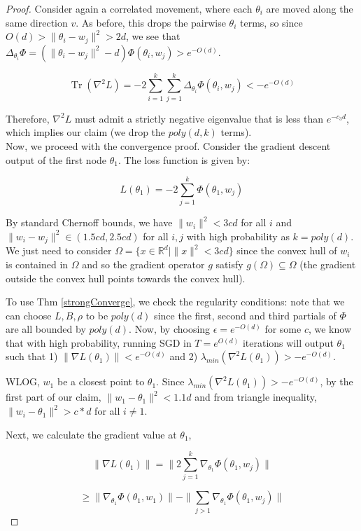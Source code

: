 \documentclass[11pt]{article}
\newcommand{\R}{{\mathbb{R}}}
\DeclareMathOperator{\Tr}{Tr}
\begin{document}
\begin{proof}
Consider again a correlated movement, where each $\theta_i$ are moved along the same direction $v$. As before, this drops the pairwise $\theta_i$ terms, so since $O(d) > \|\theta_i -w_j\|^2 > 2d$, we see that $\Delta_{\theta_i} \Phi = (\|\theta_i -w_j\|^2 - d)\Phi(\theta_i,w_j) > e^{-O(d)}$. 

\[\Tr(\nabla^2 L) = -2\sum_{i=1}^k \sum_{j=1}^k \Delta_{\theta_i}\Phi(\theta_i, w_j) < -e^{-O(d)}\]

Therefore, $\nabla^2 L$ must admit a strictly negative eigenvalue that is less than $e^{-c_3 d}$, which implies our claim (we drop the $poly(d,k)$ terms).\\

Now, we proceed with the convergence proof. Consider the gradient descent output of the first node $\theta_1$. The loss function is given by:

\[L(\theta_1) =  - 2\sum_{j=1}^k \Phi(\theta_1,w_j)\]

By standard Chernoff bounds, we have $\|w_i\|^2 < 3cd$ for all $i$ and $\|w_i -w_j\|^2 \in (1.5cd, 2.5cd)$ for all $i, j$ with high probability as $k = poly(d)$. We just need to consider $\Omega = \{ x \in \R^d | \|x \|^2 < 3cd\}$ since the convex hull of $w_i$ is contained in $\Omega$ and so the gradient operator $g$ satisfy $g(\Omega) \subseteq \Omega$ (the gradient outside the convex hull points towards the convex hull).  

To use Thm \ref{strongConverge}, we check the regularity conditions: note that we can choose $L, B, \rho$ to be $poly(d)$ since the first, second and third partials of $\Phi$ are all bounded by $poly(d)$. Now, by choosing $\epsilon = e^{-O(d)}$ for some $c$, we know that with high probability, running SGD in $T = e^{O(d)}$ iterations will output $\theta_1$ such that 1) $\|\nabla L (\theta_1)\| < e^{-O(d)}$ and 2) $\lambda_{min}(\nabla^2L(\theta_1)) > -e^{-O(d)}$.

WLOG, $w_1$ be a closest point to $\theta_1$. Since  $\lambda_{min}(\nabla^2L(\theta_1)) > -e^{-O(d)}$, by the first part of our claim, $\|w_1 - \theta_1\|^2 < 1.1d$ and from triangle inequality, $\|w_i - \theta_1 \|^2 > c*d$ for all $i \neq 1$. 

Next, we calculate the gradient value at $\theta_1$, 

\[\|\nabla L(\theta_1)\| = \|2\sum_{j=1}^k \nabla_{\theta_1}\Phi(\theta_1,w_j)\|\]

\[ \geq \|\nabla_{\theta_1} \Phi(\theta_1,w_1) \| - \|\sum_{j>1} \nabla_{\theta_1}\Phi(\theta_1,w_j)\|\]


\end{proof}
\end{document}
